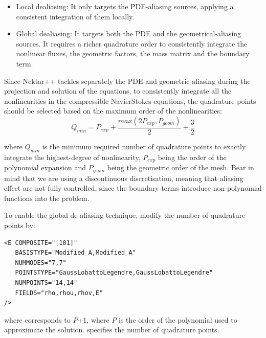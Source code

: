 \begin{itemize}
\item Local dealiasing: It only targets the PDE-aliasing sources, applying a consistent integration of them locally.
\item Global dealiasing: It targets both the PDE and the geometrical-aliasing sources. It requires a richer quadrature order to consistently integrate the nonlinear fluxes, the geometric factors, the mass matrix and the boundary term.
\end{itemize}

Since Nektar++ tackles separately the PDE and geometric aliasing during the
projection and solution of the equations, to consistently
integrate all the nonlinearities in the compressible
NavierStokes equations, the quadrature points should
be selected based on the maximum order of the nonlinearities:
\begin{equation}
Q_{min}= P_{exp}+\frac{max(2P_{exp},P_{geom})}{2} + \frac{3}{2}
\end{equation}

where $Q_{min}$ is the minimum required number of quadrature
points to exactly integrate the highest-degree of nonlinearity,
$P_{exp}$ being the order of the polynomial expansion and $P_{geom}$
being the geometric order of the mesh. Bear in mind that we are
using a discontinuous discretisation, meaning that aliasing
effect are not fully controlled, since the boundary terms
introduce non-polynomial functions into the problem.

To enable the global de-aliasing technique, modify the number of quadrature
points by:

\begin{lstlisting}[style=XmlStyle]
<E COMPOSITE="[101]"
   BASISTYPE="Modified_A,Modified_A"
   NUMMODES="7,7"
   POINTSTYPE="GaussLobattoLegendre,GaussLobattoLegendre"
   NUMPOINTS="14,14"
   FIELDS="rho,rhou,rhov,E"
/>
\end{lstlisting}

where  corresponds to $P$+1, where $P$ is the order of the polynomial
used to approximate the solution.  specifies the number of quadrature
points.
